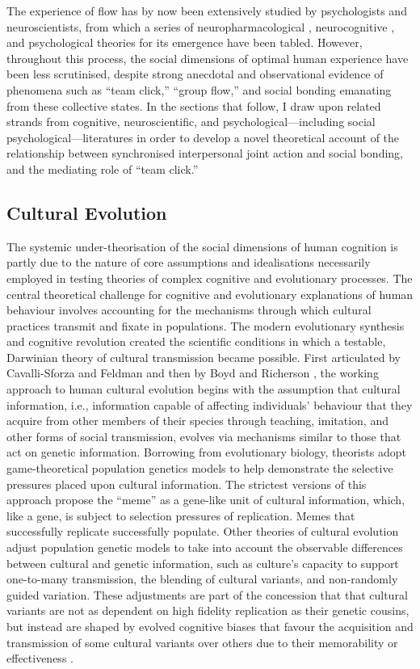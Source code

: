 The experience of flow has by now been extensively studied by psychologists and neuroscientists, from which a series of neuropharmacological \citep{Boecker2008}, neurocognitive \citep{Dietrich2006,Dietrich2011,Labelle2013}, and psychological \citep{Csikszentmihalyi1992} theories for its emergence have been tabled. However, throughout this process, the social dimensions of optimal human experience have been less scrutinised, despite strong anecdotal and observational evidence of phenomena such as ``team click,'' ``group flow,'' and social bonding emanating from these collective states. In the sections that follow, I draw upon related strands from cognitive, neuroscientific, and psychological---including social psychological---literatures in order to develop a novel theoretical account of the relationship between synchronised interpersonal joint action and social bonding, and the mediating role of ``team click.''

  \subsection{Cultural Evolution} %
  The systemic under-theorisation of the social dimensions of human cognition is partly due to the nature of core assumptions and idealisations necessarily employed in testing theories of complex cognitive and evolutionary processes.  The central theoretical challenge for cognitive and evolutionary explanations of human behaviour involves accounting for the mechanisms through which cultural practices transmit and fixate in populations. The modern evolutionary synthesis and cognitive revolution created the scientific conditions in which a testable, Darwinian theory of cultural transmission became possible.  First articulated by Cavalli-Sforza and Feldman \textcite{Cavalli-Sforza1981} and then by Boyd and Richerson \textcite{Boyd1988}, the working approach to human cultural evolution begins with the assumption that cultural information, i.e., information capable of affecting individuals' behaviour that they acquire from other members of their species through teaching, imitation, and other forms of social transmission, evolves via mechanisms similar to those that act on genetic information.  Borrowing from evolutionary biology, theorists adopt game-theoretical population genetics models to help demonstrate the selective pressures placed upon cultural information.
  The strictest versions of this approach propose the ``meme'' as a gene-like unit of cultural information, which, like a gene, is subject to selection pressures of replication.  Memes that successfully replicate successfully populate\citep{Dawkins1976}. Other theories of cultural evolution adjust population genetic models to take into account the observable differences between cultural and genetic information, such as culture's capacity to support one-to-many transmission, the blending of cultural variants, and non-randomly guided variation.  These adjustments are part of the concession that that cultural variants are not as dependent on high fidelity replication as their genetic cousins, but instead are shaped by evolved cognitive biases that favour the acquisition and transmission of some cultural variants over others due to their memorability or effectiveness \citep{Henrich2007}.


